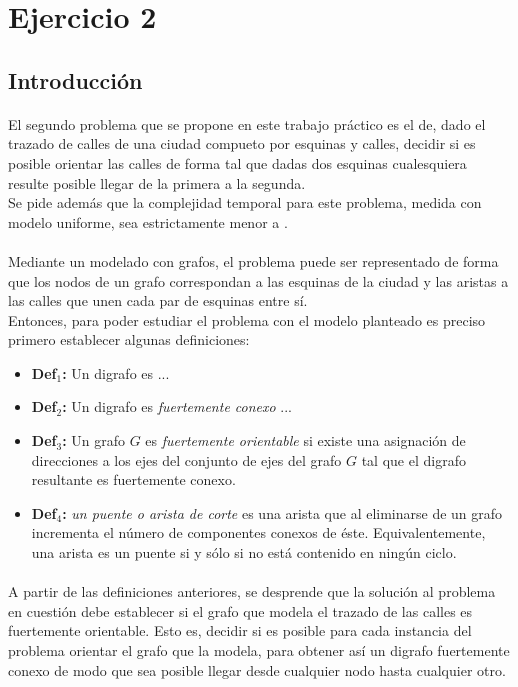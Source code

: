 \section{Ejercicio 2}

\subsection{Introducción}
\label{intro2}

\paragraph{}
El segundo problema que se propone en este trabajo práctico es el de, dado el trazado de calles de una ciudad compueto por esquinas y calles, decidir si es posible orientar las calles de forma tal que dadas dos esquinas cualesquiera resulte posible llegar de la primera a la segunda.\\
Se pide además que la complejidad temporal para este problema, medida con modelo uniforme, sea estrictamente menor a .

\paragraph{}
Mediante un modelado con grafos, el problema puede ser representado de forma que los nodos de un grafo correspondan a las esquinas de la ciudad y las aristas a las calles que unen cada par de esquinas entre sí. \\
Entonces, para poder estudiar el problema con el modelo planteado es preciso primero establecer algunas definiciones:
\begin{itemize}
	\item \textbf{Def$_1$:} Un digrafo es ...
	\item \textbf{Def$_2$:} Un digrafo es \textit{fuertemente conexo} ...
	\item \textbf{Def$_3$:} Un grafo $G$ es \textit{fuertemente orientable} si existe una asignación de direcciones a los ejes del conjunto de ejes del grafo $G$ tal que el digrafo resultante es fuertemente conexo. 
	\item \textbf{Def$_4$:} \textit{un puente o arista de corte} es una arista que al eliminarse de un grafo incrementa el número de componentes conexos de éste. Equivalentemente, una arista es un puente si y sólo si no está contenido en ningún ciclo.
\end{itemize}

\paragraph{}
A partir de las definiciones anteriores, se desprende que la solución al problema en cuestión debe establecer si el grafo que modela el trazado de las calles es fuertemente orientable. Esto es, decidir si es posible para cada instancia del problema orientar el grafo que la modela, para obtener así un digrafo fuertemente conexo de modo que sea posible llegar desde cualquier nodo hasta cualquier otro.


